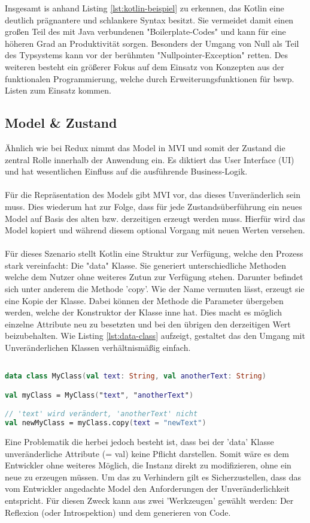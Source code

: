 \bigskip
Insgesamt is anhand Listing
\ref{lst:kotlin-beispiel}
zu erkennen, das Kotlin eine deutlich prägnantere und schlankere Syntax besitzt. Sie vermeidet damit einen großen Teil des mit Java verbundenen "Boilerplate-Codes" und kann für eine höheren Grad an Produktivität sorgen. Besonders der Umgang von Null als Teil des Typsystems kann vor der berühmten "Nullpointer-Exception" retten. Des weiteren besteht ein größerer Fokus auf dem Einsatz von Konzepten aus der funktionalen Programmierung, welche durch Erweiterungsfunktionen für bswp. Listen zum Einsatz kommen.

\subsection{Model \& Zustand}
Ähnlich wie bei Redux nimmt das Model in MVI und somit der Zustand die zentral Rolle innerhalb der Anwendung ein. Es diktiert das User Interface (UI) und hat wesentlichen Einfluss auf die ausführende Business-Logik.
\\
\\
Für die Repräsentation des Models gibt MVI vor, das dieses Unveränderlich sein muss. Dies wiederum hat zur Folge, dass für jede Zustandsüberführung ein neues Model auf Basis des alten bzw. derzeitigen erzeugt werden muss. Hierfür wird das Model kopiert und während diesem optional Vorgang mit neuen Werten versehen. 
\\
\\
Für dieses Szenario stellt Kotlin eine Struktur zur Verfügung, welche den Prozess stark vereinfacht: Die "data" Klasse. Sie generiert unterschiedliche Methoden welche dem Nutzer ohne weiteres Zutun zur Verfügung stehen. Darunter befindet sich unter anderem die Methode 'copy'. Wie der Name vermuten lässt, erzeugt sie eine Kopie der Klasse. Dabei können der Methode die Parameter übergeben werden, welche der Konstruktor der Klasse inne hat. Dies macht es möglich einzelne Attribute neu zu besetzten und bei den übrigen den derzeitigen Wert beizubehalten. Wie Listing
\ref{lst:data-class}
aufzeigt, gestaltet das den Umgang mit Unveränderlichen Klassen verhältnismäßig einfach.
\begin{lstlisting}[caption={data class}, label={lst:data-class}, language=Kotlin]

data class MyClass(val text: String, val anotherText: String)

val myClass = MyClass("text", "anotherText")

// 'text' wird verändert, 'anotherText' nicht
val newMyClass = myClass.copy(text = "newText")
\end{lstlisting}
\bigskip
Eine Problematik die herbei jedoch besteht ist, dass bei der 'data' Klasse unveränderliche Attribute (= val) keine Pflicht darstellen. Somit wäre es dem Entwickler ohne weiteres Möglich, die Instanz direkt zu modifizieren, ohne ein neue zu erzeugen müssen. Um das zu Verhindern gilt es Sicherzustellen, dass das vom Entwickler angedachte Model den Anforderungen der Unveränderlichkeit entspricht. Für diesen Zweck kann aus zwei 'Werkzeugen' gewählt werden: Der Reflexion (oder Introspektion) und dem generieren von Code.  
